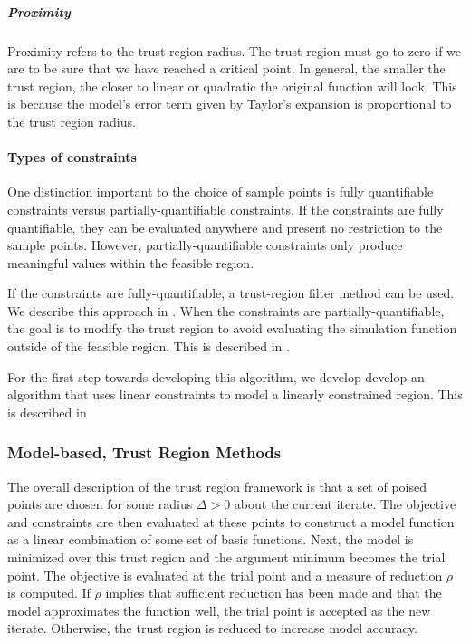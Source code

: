 \documentclass{article}
\begin{document}
\subparagraph{Proximity}

Proximity refers to the trust region radius.
The trust region must go to zero if we are to be sure that we have reached a critical point.
In general, the smaller the trust region, the closer to linear or quadratic the original function will look.
This is because the model's error term given by Taylor's expansion is proportional to the trust region radius.


\paragraph{Types of constraints}

One distinction important to the choice of sample points is fully quantifiable constraints versus partially-quantifiable constraints.
If the constraints are fully quantifiable, they can be evaluated anywhere and present no restriction to the sample points.
However, partially-quantifiable constraints only produce meaningful values within the feasible region.

If the constraints are fully-quantifiable, a trust-region filter method can be used.
We describe this approach in \cite{}.
When the constraints are partially-quantifiable, the goal is to modify the trust region to avoid evaluating the simulation function outside of the feasible region.
This is described in \cite{}.

For the first step towards developing this algorithm, we develop develop an algorithm that uses linear constraints to model a linearly constrained region.
This is described in \cite{}




\subsubsection{Model-based, Trust Region Methods}

The overall description of the trust region framework is that a set of poised points are chosen for some radius $\Delta>0$ about the current iterate.
The objective and constraints are then evaluated at these points to construct a model function as a linear combination of some set of basis functions.
Next, the model is minimized over this trust region and the argument minimum becomes the trial point.
The objective is evaluated at the trial point and a measure of reduction $\rho$ is computed.
If $\rho$ implies that sufficient reduction has been made and that the model approximates the function well, the trial point is accepted as the new iterate.
Otherwise, the trust region is reduced to increase model accuracy.
\end{document}
